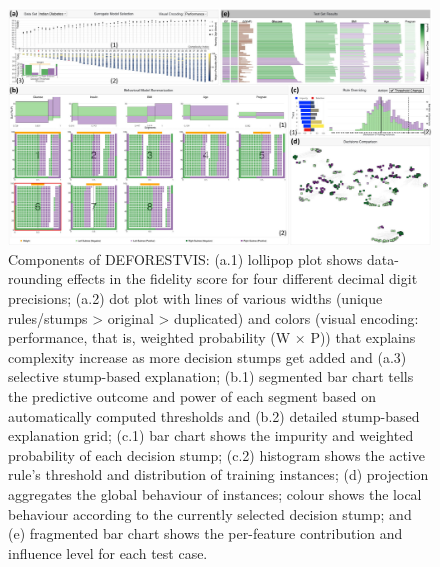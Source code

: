 \begin{figure}[ht!]
\centering
\includegraphics[width=\textwidth]{images/DeforestVis.png}
\caption{Components of DEFORESTVIS: (a.1) lollipop plot shows data-rounding effects in the fidelity score for four different decimal digit
precisions; (a.2) dot plot with lines of various widths (unique rules/stumps > original > duplicated) and colors (visual encoding: performance,
that is, weighted probability (W × P)) that explains complexity increase as more decision stumps get added and (a.3) selective stump-based
explanation; (b.1) segmented bar chart tells the predictive outcome and power of each segment based on automatically computed thresholds
and (b.2) detailed stump-based explanation grid; (c.1) bar chart shows the impurity and weighted probability of each decision stump; (c.2)
histogram shows the active rule’s threshold and distribution of training instances; (d) projection aggregates the global behaviour of instances;
colour shows the local behaviour according to the currently selected decision stump; and (e) fragmented bar chart shows the per-feature
contribution and influence level for each test case.}
\label{fig:deforestvis_interface}
\end{figure}

